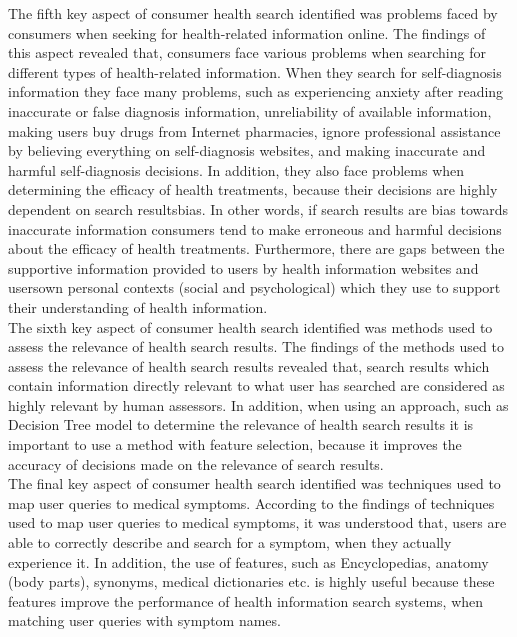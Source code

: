 \documentclass[]{article}
\begin{document}
The fifth key aspect of consumer health search identified was problems faced by consumers when seeking for health-related information online. The findings of this aspect revealed that, consumers face various problems when searching for different types of health-related information. When they search for self-diagnosis information they face many problems, such as experiencing anxiety after reading inaccurate or false diagnosis information, unreliability of available information, making users buy drugs from Internet pharmacies, ignore professional assistance by believing everything on self-diagnosis websites, and making inaccurate and harmful self-diagnosis decisions. In addition, they also face problems when determining the efficacy of health treatments, because their decisions are highly dependent on search results\textquotesingle bias. In other words, if search results are bias towards inaccurate information consumers tend to make erroneous and harmful decisions about the efficacy of health treatments. Furthermore, there are gaps between the supportive information provided to users by health information websites and users\textquotesingle own personal contexts (social and psychological) which they use to support their understanding of health information. \\ 

The sixth key aspect of consumer health search identified was methods used to assess the relevance of health search results. The findings of the methods used to assess the relevance of health search results revealed that, search results which contain information directly relevant to what user has searched are considered as highly relevant by human assessors. In addition, when using an approach, such as Decision Tree model to determine the relevance of health search results it is important to use a method with feature selection, because it improves the accuracy of decisions made on the relevance of search results.\\

The final key aspect of consumer health search identified was techniques used to map user queries to medical symptoms. According to the findings of techniques used to map user queries to medical symptoms, it was understood that, users are able to correctly describe and search for a symptom, when they actually experience it. In addition, the use of features, such as Encyclopedias, anatomy (body parts), synonyms, medical dictionaries etc. is highly useful because these features improve the performance of health information search systems, when matching user queries with symptom names. \\   
\end{document}
